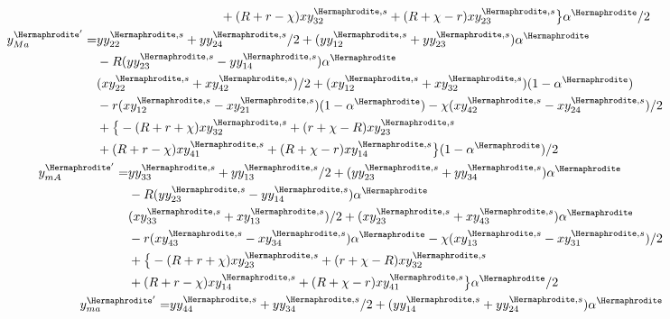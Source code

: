 \documentclass[12pt]{article}
\begin{document}
\begin{subequations}
\begin{align}
\begin{split}
& + (R+r-\chi)xy_{32}^{\Hermaphrodite,s} + (R+\chi-r) xy_{23}^{\Hermaphrodite,s}\big{\}}\alpha^\Hermaphrodite/2
\end{split}
\\
%
\begin{split}
y_{Ma}^{{\Hermaphrodite}'}=&yy_{22}^{\Hermaphrodite,s}+yy_{24}^{\Hermaphrodite,s}/2+(yy_{12}^{\Hermaphrodite,s}+yy_{23}^{\Hermaphrodite,s})\alpha^\Hermaphrodite\\
&-R(yy_{23}^{\Hermaphrodite,s}-yy_{14}^{\Hermaphrodite,s}) \alpha^\Hermaphrodite\\
&(xy_{22}^{\Hermaphrodite,s}+xy_{42}^{\Hermaphrodite,s})/2+(xy_{12}^{\Hermaphrodite,s}+xy_{32}^{\Hermaphrodite,s})(1-\alpha^\Hermaphrodite)\\
&- r(xy_{12}^{\Hermaphrodite,s}-xy_{21}^{\Hermaphrodite,s})(1-\alpha^\Hermaphrodite) - \chi(xy_{42}^{\Hermaphrodite,s}-xy_{24}^{\Hermaphrodite,s})/2\\
&+\big{\{}-(R+r+\chi)xy_{32}^{\Hermaphrodite,s} +(r+\chi-R) xy_{23}^{\Hermaphrodite,s}\\
&+(R+r-\chi)xy_{41}^{\Hermaphrodite,s}+(R+\chi-r)xy_{14}^{\Hermaphrodite,s}\big{\}}(1-\alpha^\Hermaphrodite)/2
\end{split}
\\
%
\begin{split}
y_{mA}^{{\Hermaphrodite}'}=&yy_{33}^{\Hermaphrodite,s}+yy_{13}^{\Hermaphrodite,s}/2+(yy_{23}^{\Hermaphrodite,s}+yy_{34}^{\Hermaphrodite,s})\alpha^\Hermaphrodite\\
&-R(yy_{23}^{\Hermaphrodite,s}-yy_{14}^{\Hermaphrodite,s}) \alpha^\Hermaphrodite\\
&(xy_{33}^{\Hermaphrodite,s}+xy_{13}^{\Hermaphrodite,s})/2+(xy_{23}^{\Hermaphrodite,s}+xy_{43}^{\Hermaphrodite,s})\alpha^\Hermaphrodite\\
&- r(xy_{43}^{\Hermaphrodite,s}-xy_{34}^{\Hermaphrodite,s})\alpha^\Hermaphrodite - \chi(xy_{13}^{\Hermaphrodite,s}-xy_{31}^{\Hermaphrodite,s})/2\\
&+\big{\{}-(R+r+\chi)xy_{23}^{\Hermaphrodite,s} +(r+\chi-R)xy_{32}^{\Hermaphrodite,s}\\
&+(R+r-\chi) xy_{14}^{\Hermaphrodite,s} + (R+\chi-r) xy_{41}^{\Hermaphrodite,s}\big{\}}\alpha^\Hermaphrodite/2
\end{split}
\\
%
\begin{split}
y_{ma}^{{\Hermaphrodite}'}=&yy_{44}^{\Hermaphrodite,s}+yy_{34}^{\Hermaphrodite,s}/2+(yy_{14}^{\Hermaphrodite,s}+yy_{24}^{\Hermaphrodite,s})\alpha^\Hermaphrodite\\

\end{split}
\end{align}
\end{subequations}
\end{document}
